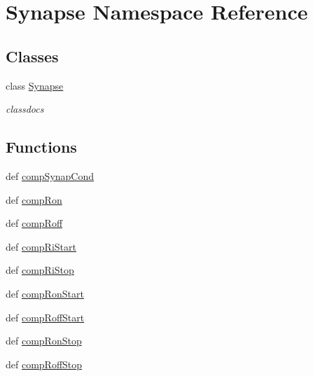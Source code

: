\hypertarget{namespace_synapse}{\section{Synapse Namespace Reference}
\label{namespace_synapse}
}
\subsection*{Classes}
\begin{DoxyCompactItemize}
\item 
class \hyperlink{class_synapse_1_1_synapse}{Synapse}
\begin{DoxyCompactList}\small\item\em classdocs \end{DoxyCompactList}\end{DoxyCompactItemize}
\subsection*{Functions}
\begin{DoxyCompactItemize}
\item 
def \hyperlink{namespace_synapse_a55ffd471fbed3550b464a9862687f541}{comp\-Synap\-Cond}
\item 
def \hyperlink{namespace_synapse_a16fdc8aab9a394041c8b6667511a1fd7}{comp\-Ron}
\item 
def \hyperlink{namespace_synapse_aadfeb939e02125a55a2b2acc6634ba41}{comp\-Roff}
\item 
def \hyperlink{namespace_synapse_a6d5943c0d974d992b8c9daa3ff3818d6}{comp\-Ri\-Start}
\item 
def \hyperlink{namespace_synapse_a67ee3bb7abbf9608bd83c31c63634cac}{comp\-Ri\-Stop}
\item 
def \hyperlink{namespace_synapse_a3bbc4948087cc789af35085ea0423a93}{comp\-Ron\-Start}
\item 
def \hyperlink{namespace_synapse_a4ff37207e236e81ae7bced77172a5af5}{comp\-Roff\-Start}
\item 
def \hyperlink{namespace_synapse_a9915f1de7bde4ece67ef45a7e7324c21}{comp\-Ron\-Stop}
\item 
def \hyperlink{namespace_synapse_a8e85651ec0d366f191a2093a1bd2bc84}{comp\-Roff\-Stop}
\end{DoxyCompactItemize}


